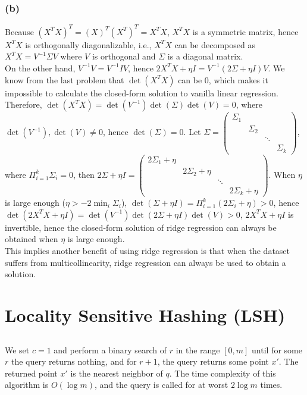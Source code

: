 \documentclass{article}
\begin{document}
            \subsubsection*{(b)}
            Because $(X^TX)^T=(X)^T(X^T)^T=X^TX$, $X^TX$ is a symmetric matrix, hence $X^TX$ is orthogonally diagonalizable, i.e., 
            $X^TX$ can be decomposed as $X^TX=V^{-1}\Sigma V$ where $V$ is orthogonal and $\Sigma$ is a diagonal matrix.\\
            On the other hand, $V^{-1}V=V^{-1}IV$, hence $2X^TX+\eta I=V^{-1}(2\Sigma + \eta I)V$. We know from the last problem that $\det(X^TX)$ can be 0, 
            which makes it impossible to calculate the closed-form solution to vanilla linear regression. \\
            Therefore, $\det(X^TX)=\det(V^{-1})\det(\Sigma)\det(V)=0$, where $\det(V^{-1}),\det(V)\neq 0$, hence $\det(\Sigma)=0$.
            Let $\Sigma=\begin{pmatrix}\Sigma_1&&\\&\Sigma_2&\\&&\ddots\\&&&\Sigma_k\end{pmatrix}$, where $\Pi_{i=1}^k \Sigma_i=0$, 
            then $2\Sigma+\eta I=\begin{pmatrix}2\Sigma_1+\eta&&\\&2\Sigma_2+\eta&\\&&\ddots\\&&&2\Sigma_k+\eta\end{pmatrix}$.
            When $\eta$ is large enough ($\eta>-2\min_i\Sigma_i$), $\det(\Sigma+\eta I)=\Pi_{i=1}^k(2\Sigma_i+\eta)>0$, hence $\det(2X^TX+\eta I)=\det(V^{-1})\det(2\Sigma+\eta I)\det(V)>0$,
            $2X^TX+\eta I$ is invertible, hence the closed-form solution of ridge regression can always be obtained when $\eta$ is large enough.\\
            This implies another benefit of using ridge regression is that when the dataset suffers from multicollinearity, ridge regression can always be used to obtain a solution.

        

    \section{Locality Sensitive Hashing (LSH)}

        \subsection{}
        We set $c=1$ and perform a binary search of $r$ in the range $[0, m]$ until for some $r$ the query returns nothing, and for $r+1$, the query returns some point $x'$.
        The returned point $x'$ is the nearest neighbor of $q$. The time complexity of this algorithm is $O(\log m)$, and the query is called for at worst $2\log m$ times.
\end{document}
